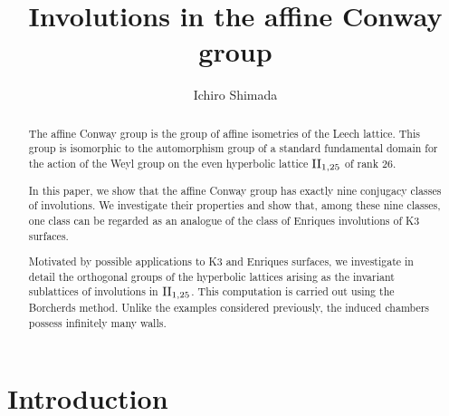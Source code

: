 \documentclass{amsart} %
\begin{document}
%
\title[Involutions in the affine Conway group]
{Involutions in the affine Conway group}
%
\author{Ichiro Shimada}
\address{Department of Mathematics,
Graduate School of Science,
Hiroshima University,
1-3-1 Kagamiyama,
Higashi-Hiroshima,
739-8526 JAPAN}
%
%
\begin{abstract}
The affine Conway group is the group of affine isometries of the Leech lattice.
This group is isomorphic to the automorphism group of 
a standard fundamental domain for the action of 
the Weyl group on the even                                                                                                                                                                                                                                                                                                      hyperbolic lattice $\mathrm{II}_{1, 25}$ of rank $26$.
 \par
In this paper, we show that the affine Conway group has exactly nine conjugacy classes of involutions.
We investigate their properties
and show that, 
among these nine classes, 
one class can be regarded as an analogue of the class of Enriques involutions of K3 surfaces.
 \par
Motivated by possible applications to K3 and Enriques surfaces, 
we investigate in detail the orthogonal groups of the hyperbolic lattices 
arising as the invariant sublattices of involutions in $\mathrm{II}_{1, 25}$.
This computation is carried out using the Borcherds method.
Unlike the examples considered previously, 
 the induced chambers possess infinitely many walls.
\end{abstract}
%
\maketitle
%
%
% 
\section{Introduction}
%
\end{document}
